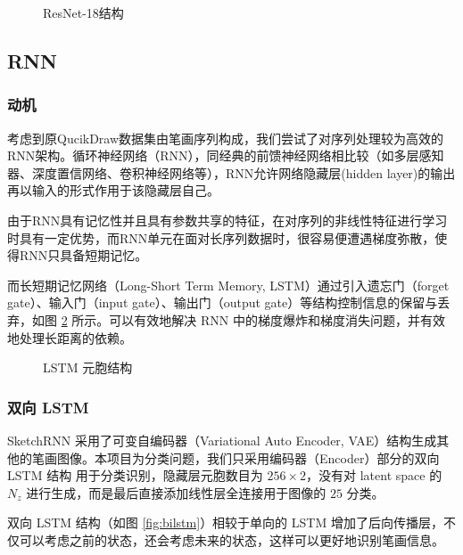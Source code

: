 \begin{figure}[ht]
    \centering
    
    \caption{ResNet-18结构}
    \label{fig:ResNet-18}
\end{figure}

\subsection{RNN}

\subsubsection{动机}
考虑到原QucikDraw数据集由笔画序列构成，我们尝试了对序列处理较为高效的RNN架构。循环神经网络（RNN），同经典的前馈神经网络相比较（如多层感知器、深度置信网络、卷积神经网络等），RNN允许网络隐藏层(hidden layer)的输出再以输入的形式作用于该隐藏层自己。

由于RNN具有记忆性并且具有参数共享的特征，在对序列的非线性特征进行学习时具有一定优势，而RNN单元在面对长序列数据时，很容易便遭遇梯度弥散，使得RNN只具备短期记忆。

而长短期记忆网络（Long-Short Term Memory, LSTM）通过引入遗忘门（forget gate）、输入门（input gate）、输出门（output gate）等结构控制信息的保留与丢弃，如图 \ref{fig:lstm} 所示。可以有效地解决 RNN 中的梯度爆炸和梯度消失问题，并有效地处理长距离的依赖。


\begin{figure}[ht]
    \centering
    
    \caption{LSTM 元胞结构}
    \label{fig:lstm}
\end{figure}

\subsubsection{双向 LSTM}

SketchRNN \cite{sketchrnn} 采用了可变自编码器（Variational Auto Encoder, VAE）结构生成其他的笔画图像。本项目为分类问题，我们只采用编码器（Encoder）部分的双向 LSTM 结构 \cite{bilstm} 用于分类识别，隐藏层元胞数目为 $256\times 2$，没有对 latent  space 的 $N_z$ 进行生成，而是最后直接添加线性层全连接用于图像的 $25$ 分类。

双向 LSTM 结构（如图 \ref{fig:bilstm}）相较于单向的 LSTM 增加了后向传播层，不仅可以考虑之前的状态，还会考虑未来的状态，这样可以更好地识别笔画信息。


